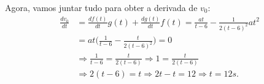 \documentclass[PhysicsI/physics_notes.tex]{subfiles}
\begin{document}
Agora, vamos juntar tudo para obter a derivada de $v_{0}$:
\begin{align*}
	\frac{dv_{0}}{dt} & = \frac{df(t)}{dt}g(t) + \frac{dg(t)}{dt}f(t) = \frac{at}{t-6} - \frac{1}{2(t-6)^{2}}at^{2} \\
	                  & = at\biggl(\frac{1}{t-6} - \frac{t}{2(t-6)^{2}}\biggr) = 0                                  \\
	                  & \Rightarrow \frac{1}{t-6} = \frac{t}{2(t-6)} \Rightarrow 1 = \frac{t}{2(t-6)}               \\
	                  & \Rightarrow 2(t-6) = t \Rightarrow 2t - t = 12 \Rightarrow t = 12s.
\end{align*}
\end{document}
